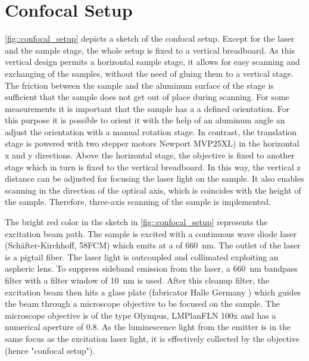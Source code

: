 	\section[Confocal Setup]{Confocal Setup} \label{sec::confocal}

		\autoref{fig::confocal_setup} depicts a sketch of the confocal setup. 
		Except for the laser and the sample stage, the whole setup is fixed to a vertical breadboard. 
		As this vertical design permits a horizontal sample stage, it allows for easy scanning and exchanging of the samples, without the need of gluing them to a vertical stage.
		The friction between the sample and the aluminum surface of the stage is sufficient that the sample does not get out of place during scanning.
		For some measurements it is important that the sample has a a defined orientation.
		For this purpose it is possible to orient it with the help of an aluminum angle an adjust the orientation with a manual rotation stage. 
		In contrast, the translation stage is powered with two stepper motors Newport MVP25XL) in the horizontal x and y directions.
		Above the horizontal stage, the objective is fixed to another stage which in turn is fixed to the vertical breadboard.
		In this way, the vertical z distance can be adjusted for focusing the laser light on the sample.
		It also enables scanning in the direction of the optical axis, which is coincides with the height of the sample.
		Therefore, three-axis scanning of the sample is implemented.

		The bright red color in the sketch in \autoref{fig::confocal_setup} represents the excitation beam path.
		The sample is excited with a continuous wave diode laser (Sch\"after-Kirchhoff, 58FCM) which emits at a \wl of \SI{660}{\nano\meter}.
		The outlet of the laser is a pigtail fiber.
		The laser light is outcoupled and collimated exploiting an aspheric lens.
		To suppress sideband emission from the laser, a \SI{660}{\nm} bandpass filter with a filter window of  \SI{10}{\nm} is used.
		After this cleanup filter, the excitation beam then hits a glass plate (fabricator Halle Germany ) which guides the beam through a microscope objective to be focused on the sample.
		The microscope objective is of the type Olympus, LMPlanFLN 100x and has a numerical aperture of 0.8.
		As the luminescence light from the emitter is in the same focus as the excitation laser light, it is effectively collected by the objective (hence "confocal setup").

